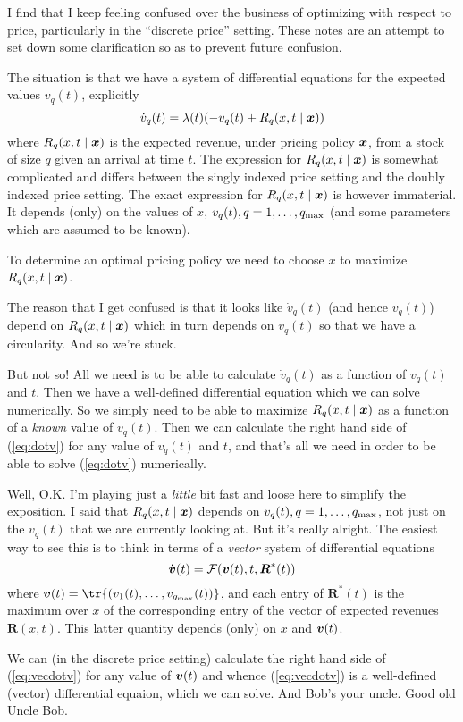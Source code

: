
\usepackage{amsmath,amssymb}
\newcommand{\vex}{\mbox{\boldmath $x$}}
\newcommand{\vv}{\mbox{\boldmath $v$}}


I find that I keep feeling confused over the business of optimizing
with respect to price, particularly in the ``discrete price''
setting.  These notes are an attempt to set down some clarification
so as to prevent future confusion.

The situation is that we have a system of differential equations
for the expected values $v_q(t)$, explicitly
\begin{equation}
\dot{v}_q(t) = \lambda(t) (-v_q(t) + R_q(x,t \mid \vex))
\label{eq:dotv}
\end{equation}
where $R_q(x,t \mid \vex)$ is the expected revenue, under pricing
policy $\vex$, from a stock of size $q$ given an arrival at time $t$.
The expression for $R_q(x,t \mid \vex)$ is somewhat complicated and
differs between the singly indexed price setting and the doubly
indexed price setting.  The exact expression for $R_q(x,t \mid \vex)$
is however immaterial.  It depends (only) on the values of $x$,
$v_q(t), q = 1, \ldots, q_{\rm max}$ (and some parameters which are
assumed to be known).

To determine an optimal pricing policy we need to choose $x$ to
maximize $R_q(x,t \mid \vex)$.

The reason that I get confused is that it looks like $\dot{v}_q(t)$ (and
hence $v_q(t)$) depend on $R_q(x,t \mid \vex)$ which in turn depends on
$v_q(t)$ so that we have a circularity.  And so we're stuck.

But not so!  All we need is to be able to calculate $\dot{v}_q(t)$
as a function of $v_q(t)$ and $t$.  Then we have a well-defined
differential equation which we can solve numerically.  So we
simply need to be able to maximize $R_q(x,t \mid \vex)$ as a function
of a \emph{known} value of $v_q(t)$.  Then we can calculate the right
hand side of (\ref{eq:dotv}) for any value of $v_q(t)$ and $t$, and
that's all we need in order to be able to solve (\ref{eq:dotv})
numerically.

Well, O.K.  I'm playing just a \emph{little} bit fast and loose
here to simplify the exposition.  I said that $R_q(x,t \mid \vex)$
depends on $v_q(t), q = 1, \ldots, q_{\rm max}$, not just on the
$v_q(t)$ that we are currently looking at.  But it's really alright.
The easiest way to see this is to think in terms of a \emph{vector}
system of differential equations
\begin{equation}
\dot{\vv}(t) = {\cal F}(\vv(t),t,\boldsymbol{R}^*(t))
\label{eq:vecdotv}
\end{equation}
where $\vv(t) = \tr{(v_1(t), \ldots, v_{q_{\rm max}}(t))}$,
and each entry of $\boldsymbol{R}^*(t)$ is the maximum over $x$
of the corresponding entry of the vector of expected revenues
$\boldsymbol{R}(x,t)$. This latter quantity depends (only) on $x$
and $\vv(t)$.

We can (in the discrete price setting) calculate the right hand
side of (\ref{eq:vecdotv}) for any value of $\vv(t)$ and whence
(\ref{eq:vecdotv}) is a well-defined (vector) differential equaion,
which we can solve.  And Bob's your uncle.  Good old Uncle Bob.


